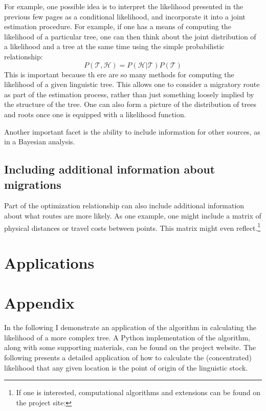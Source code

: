 \documentclass[11pt]{article}
\begin{document}
For example, one possible idea is to interpret the likelihood presented in the previous few pages as a conditional likelihood, and incorporate it into a joint estimation procedure. For example, if one has a means of computing the likelihood of a particular tree, one can then think about the joint distribution of a likelihood and a tree at the same time using the simple probabilistic relationship:
$$
P(\mathcal{T},\mathcal{H})=P(\mathcal{H}|\mathcal{T})P(\mathcal{T})
$$
This is important because th
ere are so many methods for computing the likelihood of a given linguistic tree. This allows one to consider a migratory route as part of the estimation process, rather than just something loosely implied by the structure of the tree. One can also form a picture of the distribution of trees and roots once one is equipped with a likelihood function. 

Another important facet is the ability to include information for other sources, as in a Bayesian analysis. 

\subsection{Including additional information about migrations}

Part of the optimization relationship can also include additional information about what routes are more likely. As one example, one might include a matrix of physical distances or travel costs between points. This matrix might even reflect.\footnote{If one is interested, computational algorithms and extensions can be found on the project site:} 

\section{Applications}


\section{Appendix}
In the following I demonstrate an application of the algorithm in calculating the likelihood of a more complex tree. A Python implementation of the algorithm, along with some supporting materials, can be found on the project website. The following presents a detailed application of how to calculate the (concentrated) likelihood that any given location is the point of origin of the linguistic stock. 




\newpage


\end{document}
